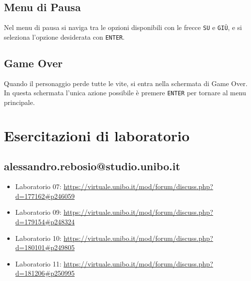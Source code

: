 \documentclass[a4paper,12pt]{report}
\begin{document}
\section{Menu di Pausa}
Nel menu di pausa si naviga tra le opzioni disponibili con le frecce \texttt{SU} e \texttt{GIÙ}, e si seleziona l'opzione desiderata con \texttt{ENTER}.

\section{Game Over}
Quando il personaggio perde tutte le vite, si entra nella schermata di Game Over. In questa schermata l'unica azione possibile è premere \texttt{ENTER} per tornare al menu principale.

\chapter{Esercitazioni di laboratorio}
\section{alessandro.rebosio@studio.unibo.it}

\begin{itemize}
	\item Laboratorio 07: \url{https://virtuale.unibo.it/mod/forum/discuss.php?d=177162#p246059}
	\item Laboratorio 09: \url{https://virtuale.unibo.it/mod/forum/discuss.php?d=179154#p248324}
	\item Laboratorio 10: \url{https://virtuale.unibo.it/mod/forum/discuss.php?d=180101#p249805}
	\item Laboratorio 11: \url{https://virtuale.unibo.it/mod/forum/discuss.php?d=181206#p250995}
\end{itemize}




\nocite{*}
\end{document}
